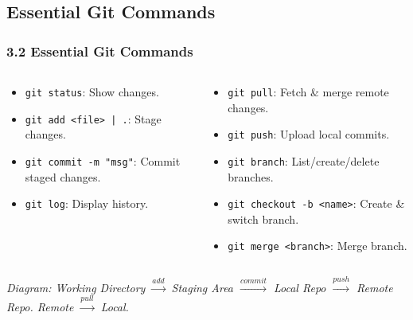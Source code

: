 \documentclass{beamer}
\begin{document}
\subsection{Essential Git Commands}
\begin{frame}
  \frametitle{3.2 Essential Git Commands}
  \begin{columns}[T] %
    \begin{column}{.5\textwidth}
      \begin{itemize}
        \item \texttt{git status}: Show changes.
        \item \texttt{git add <file> | .}: Stage changes.
        \item \texttt{git commit -m "msg"}: Commit staged changes.
        \item \texttt{git log}: Display history.
      \end{itemize}
    \end{column}
    \begin{column}{.5\textwidth}
      \begin{itemize}
        \item \texttt{git pull}: Fetch \& merge remote changes.
        \item \texttt{git push}: Upload local commits.
        \item \texttt{git branch}: List/create/delete branches.
        \item \texttt{git checkout -b <name>}: Create \& switch branch.
        \item \texttt{git merge <branch>}: Merge branch.
      \end{itemize}
    \end{column}
  \end{columns}
  \vfill
  \textit{Diagram: Working Directory \(\xrightarrow{add}\) Staging Area \(\xrightarrow{commit}\) Local Repo \(\xrightarrow{push}\) Remote Repo. Remote \(\xrightarrow{pull}\) Local.}
\end{frame}
\end{document}
